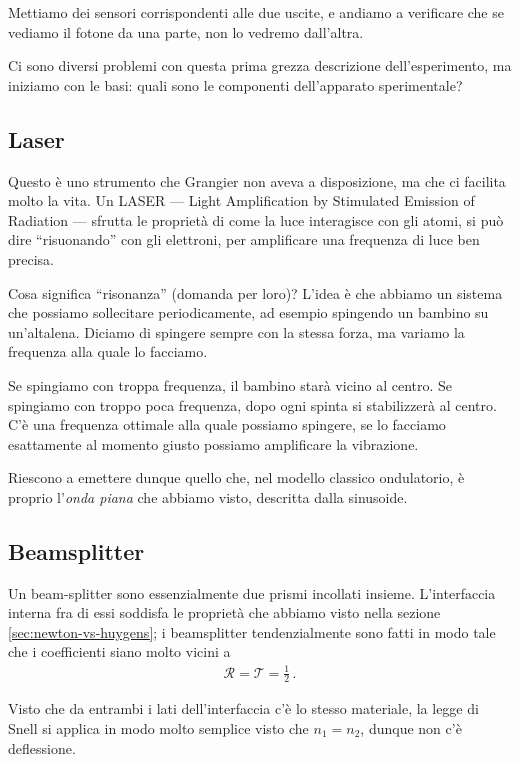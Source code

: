 \documentclass[a4paper,12pt]{article}
\begin{document}
Mettiamo dei sensori corrispondenti alle due uscite, e andiamo a verificare che se vediamo il fotone da una parte, non lo vedremo dall'altra.

Ci sono diversi problemi con questa prima grezza descrizione dell'esperimento, ma iniziamo con le basi: quali sono le componenti dell'apparato sperimentale?

\subsection{Laser}

Questo è uno strumento che Grangier non aveva a disposizione, ma che ci facilita molto la vita. 
Un LASER --- Light Amplification by Stimulated Emission of Radiation --- sfrutta le proprietà di come la luce interagisce con gli atomi, si può dire ``risuonando'' con gli elettroni, per amplificare una frequenza di luce ben precisa.

Cosa significa ``risonanza'' (domanda per loro)? 
L'idea è che abbiamo un sistema che possiamo sollecitare periodicamente, ad esempio spingendo un bambino su un'altalena.
Diciamo di spingere sempre con la stessa forza, ma variamo la frequenza alla quale lo facciamo.

Se spingiamo con troppa frequenza, il bambino starà vicino al centro. Se spingiamo con troppo poca frequenza, dopo ogni spinta si stabilizzerà al centro.
C'è una frequenza ottimale alla quale possiamo spingere, se lo facciamo esattamente al momento giusto possiamo amplificare la vibrazione.

Riescono a emettere dunque quello che, nel modello classico ondulatorio, è proprio l'\emph{onda piana} che abbiamo visto, descritta dalla sinusoide.

\subsection{Beamsplitter}

Un beam-splitter sono essenzialmente due prismi incollati insieme.
L'interfaccia interna fra di essi soddisfa le proprietà che abbiamo visto nella sezione \ref{sec:newton-vs-huygens}; i beamsplitter tendenzialmente sono fatti in modo tale che i coefficienti siano molto vicini a 
%
\begin{align}
\mathcal{R} = \mathcal{T} = \frac{1}{2}
\,.
\end{align}

Visto che da entrambi i lati dell'interfaccia c'è lo stesso materiale, la legge di Snell si applica in modo molto semplice visto che \(n_1 = n_2 \), dunque non c'è deflessione.
\end{document}
